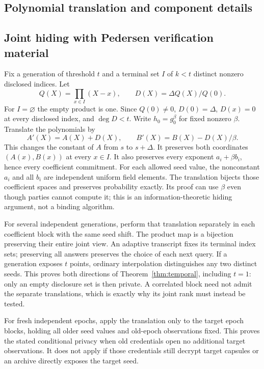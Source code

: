 \documentclass[pdflatex,sn-mathphys-num]{sn-jnl}
\theoremstyle{plain}
\theoremstyle{definition}
\begin{document}
\begin{appendices}
\section{Polynomial translation and component details}\label{app:proofs}

\subsection{Joint hiding with Pedersen verification material}
Fix a generation of threshold $t$ and a terminal set $I$ of $k<t$ distinct nonzero disclosed indices. Let
\[
 Q(X)=\prod_{x\in I}(X-x),\qquad
 D(X)=\Delta Q(X)/Q(0).
\]
For $I=\varnothing$ the empty product is one. Since $Q(0)\ne0$, $D(0)=\Delta$, $D(x)=0$ at every disclosed index, and $\deg D<t$. Write $h_0=g_0^\beta$ for fixed nonzero $\beta$. Translate the polynomials by
\[
 A'(X)=A(X)+D(X),\qquad B'(X)=B(X)-D(X)/\beta.
\]
This changes the constant of $A$ from $s$ to $s+\Delta$. It preserves both coordinates $(A(x),B(x))$ at every $x\in I$. It also preserves every exponent $a_i+\beta b_i$, hence every coefficient commitment. For each allowed seed value, the nonconstant $a_i$ and all $b_i$ are independent uniform field elements. The translation bijects those coefficient spaces and preserves probability exactly. Its proof can use $\beta$ even though parties cannot compute it; this is an information-theoretic hiding argument, not a binding algorithm.

For several independent generations, perform that translation separately in each coefficient block with the same seed shift. The product map is a bijection preserving their entire joint view. An adaptive transcript fixes its terminal index sets; preserving all answers preserves the choice of each next query. If a generation exposes $t$ points, ordinary interpolation distinguishes any two distinct seeds. This proves both directions of Theorem~\ref{thm:temporal}, including $t=1$: only an empty disclosure set is then private. A correlated block need not admit the separate translations, which is exactly why its joint rank must instead be tested.

For fresh independent epochs, apply the translation only to the target epoch blocks, holding all older seed values and old-epoch observations fixed. This proves the stated conditional privacy when old credentials open no additional target observations. It does not apply if those credentials still decrypt target capsules or an archive directly exposes the target seed.


\end{appendices}
\end{document}
